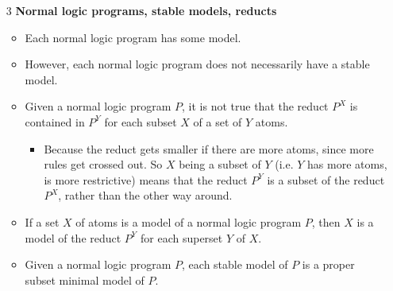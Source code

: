 \documentclass[9pt,a4paper,landscape]{article}
\begin{document}
{\begin{itemize}
	\item[3] \textbf{Normal logic programs, stable models, reducts}
	\begin{itemize}[noitemsep]
		\item Each normal logic program has some model.
		\item However, each normal logic program does not necessarily have a stable model.
		\item Given a normal logic program $P$, it is not true that the reduct $P^X$ is contained in $P^Y$ for each subset $X$ of a set of $Y$ atoms.
		\begin{itemize}[noitemsep]
			\item Because the reduct gets smaller if there are more atoms, since more rules get crossed out. So $X$ being a subset of $Y$ (i.e. $Y$ has more atoms, is more restrictive) means that the reduct $P^Y$ is a subset of the reduct $P^X$, rather than the other way around.
		\end{itemize}
		\item If a set $X$ of atoms is a model of a normal logic program $P$, then $X$ is a model of the reduct $P^Y$ for each superset $Y$ of $X$.
		\item Given a normal logic program $P$, each stable model of $P$ is a proper subset minimal model of $P$.
	\end{itemize}
	

\end{itemize}}
\end{document}
